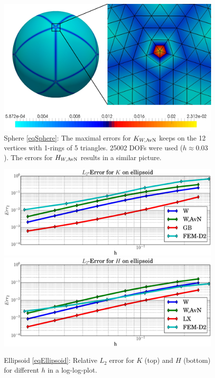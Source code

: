   \begin{figure}
    \centering\includegraphics[width=.49\textwidth]{bilder/sphere/ErrView.jpg}
    \caption{Sphere \eqref{eqSphere}:
                  The maximal errors for \( K_{W,\text{AvN}} \) keeps on the 12 vertices with 1-rings of 5 triangles.
                  25002 DOFs were used (\( h\approx 0.03 \)).
                  The errors for \( H_{W,\text{AvN}} \) results in a similar picture.}
    \label{figSphereErrView}
  \end{figure}

  \begin{figure}
    \centering\includegraphics[width=.49\textwidth]{bilder/ellipsoid/L2K.eps}
    \centering\includegraphics[width=.49\textwidth]{bilder/ellipsoid/L2H.eps}
    \caption{Ellipsoid \eqref{eqEllipsoid}: Relative \( L_{2} \) error for \( K \) (top) and
                                                     \( H \) (bottom) for different \( h \) in a log-log-plot.}
    \label{figEllipsoidL2Err}
  \end{figure}

